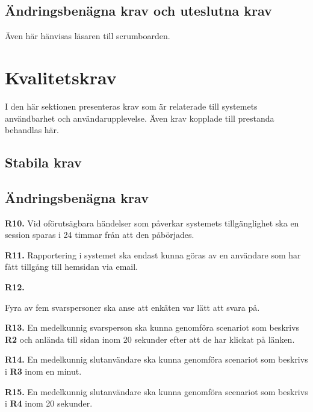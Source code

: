 \documentclass{article}
\begin{document}
    
    \subsection{Ändringsbenägna krav och uteslutna krav}
    Även här hänvisas läsaren till scrumboarden.
    
  \newpage
   
    \section{Kvalitetskrav}
\normalsize{I den här sektionen presenteras krav som är relaterade till systemets användbarhet och användarupplevelse. Även krav kopplade till prestanda behandlas här.
}
    \subsection{Stabila krav}
    
  
\subsection{Ändringsbenägna krav}
     \noindent \large{\textbf{R10.}}
    \normalsize{Vid oförutsägbara händelser som påverkar systemets tillgänglighet ska en session sparas i 24 timmar från att den påbörjades.}

\vspace{1em}

    \noindent \large{\textbf{R11.}}
    \normalsize{Rapportering i systemet ska endast kunna göras av en användare som har fått tillgång till hemsidan via email.
    }
    
\vspace{1em}
\noindent \large{\textbf{R12.}}
    \normalsize{Fyra av fem svarspersoner ska anse att enkäten var lätt att svara på.
    
    }
    \vspace{1em}
    
\noindent \large{\textbf{R13.}}
\normalsize{En medelkunnig svarsperson ska kunna genomföra scenariot som beskrivs  \textbf{R2} och anlända till sidan inom 20 sekunder efter att de har klickat på länken.
    }
\vspace{1em}

\noindent \large{\textbf{R14.}}
    \normalsize{En medelkunnig slutanvändare ska kunna genomföra scenariot som beskrivs i \textbf{R3} inom en minut.
    }
    \vspace{1em}
    
\noindent \large{\textbf{R15.}}
    \normalsize{En medelkunnig slutanvändare ska kunna genomföra scenariot som beskrivs i \textbf{R4} inom 20 sekunder.
    }
    
\end{document}
